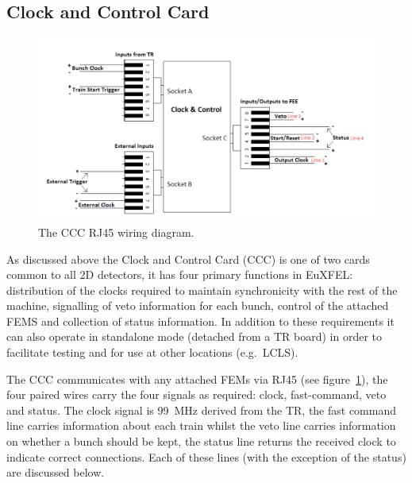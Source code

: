 \subsection{Clock and Control Card} %
\label{sub:clock_and_control_card}
\begin{figure}[h]
  \centering
    \includegraphics[width=.9\textwidth]{appendix_XFEL/images/Other/CCC_RJ45_diagram.png}
  \caption{The CCC RJ45 wiring diagram.}
  \label{fig:CCC_RJ45_diagram}
\end{figure}

As discussed above the Clock and Control Card (CCC) is one of two cards common to all 2D detectors, it has four primary functions in EuXFEL: distribution of the clocks required to maintain synchronicity with the rest of the machine, signalling of veto information for each bunch, control of the attached FEMS and collection of status information. In addition to these requirements it can also operate in standalone mode (detached from a TR board) in order to facilitate testing and for use at other locations (e.g.\ LCLS). 

The CCC communicates with any attached FEMs via RJ45 (see figure~\ref{fig:CCC_RJ45_diagram}), the four paired wires carry the four signals as required: clock, fast-command, veto and status. The clock signal is 99~MHz derived from the TR, the fast command line carries information about each train whilst the veto line carries information on whether a bunch should be kept, the status line returns the received clock to indicate correct connections. Each of these lines (with the exception of the status) are discussed below.

